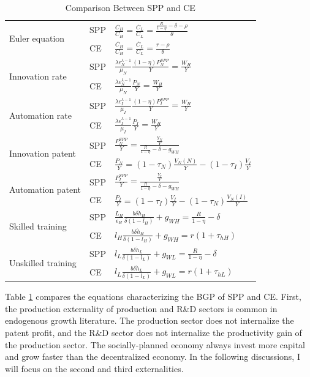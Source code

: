 \documentclass[12pt]{article}
\begin{document}
\begin{table}[h!]
\center
\scriptsize
\renewcommand{\arraystretch}{2}
\begin{tabular}{l|ll}
\hline \hline
\multirow{2}{*}{Euler equation} & SPP  &  
$\frac{\dot{C_H}}{C_H} = \frac{\dot{C_L}}{C_L} = \frac{\frac{R}{1-\eta}-\delta-\rho}{\theta}$ \\
& CE &$\frac{\dot{C_H}}{C_H} = \frac{\dot{C_L}}{C_L} = \frac{r-\rho}{\theta}$ \\\hline
\multirow{2}{*}{Innovation rate} & SPP  &  
$\frac{\lambda\epsilon_N^{\lambda-1}}{\mu_N}\frac{(1-\eta)P_N^{SPP}}{Y} = \frac{W_H}{Y} $  \\ 
& CE &$\frac{\lambda\epsilon_N^{\lambda-1}}{\mu_N}\frac{P_N}{Y}  = \frac{W_H}{Y}$ \\\hline
\multirow{2}{*}{Automation rate}  & SPP  &  
$ \frac{\lambda\epsilon_I^{\lambda-1}}{\mu_I}\frac{(1-\eta)P_I^{SPP}}{Y}  = \frac{W_H}{Y}$  \\
& CE &$ \frac{\lambda\epsilon_I^{\lambda-1}}{\mu_I}\frac{P_I}{Y}  = \frac{W_H}{Y}$ \\\hline
\multirow{2}{*}{Innovation patent} & SPP  &  
$\frac{P_N^{SPP}}{Y} = \frac{\frac{Y_N}{Y}}{\frac{R}{1-\eta}-\delta-g_{WH}}$  \\
& CE &$\frac{P_N}{Y} =(1-\tau_N)\frac{V_N(N)}{Y}-(1-\tau_I)\frac{V_I}{Y}$ \\\hline
\multirow{2}{*}{Automation patent} & SPP  &  
$\frac{P_I^{SPP}}{Y}= \frac{\frac{Y_I}{Y}}{\frac{R}{1-\eta}-\delta-g_{WH}}$  \\
& CE &$\frac{P_I}{Y}  =  (1-\tau_I)\frac{V_I}{Y}-(1-\tau_N)\frac{V_N(I)}{Y}$ \\\hline
\multirow{2}{*}{Skilled training} & SPP  &  
$\frac{L_H}{\epsilon_H}\frac{b\delta \dot{h}_H}{\delta(1-l_H)}+g_{WH} = \frac{R}{1-\eta}-\delta$  \\ 
& CE &$l_H\frac{b\delta \dot{h}_H}{\delta(1-l_H)}+g_{WH} =  r(1+\tau_{hH})$ \\\hline
\multirow{2}{*}{Unskilled training} & SPP  &  
$l_L\frac{b\delta \dot{h}_L}{\delta(1-l_L)}+g_{WL}= \frac{R}{1-\eta}-\delta$  \\ 
& CE &$l_L\frac{b\delta \dot{h}_L}{\delta(1-l_L)}+g_{WL}=  r(1+\tau_{hL})$ \\\hline
\end{tabular}
\renewcommand{\arraystretch}{1}
\caption{Comparison Between SPP and CE}
\label{SPP_CE}
\end{table}

Table \ref{SPP_CE} compares the equations characterizing the BGP of SPP and CE. First, the production externality of production and R\&D sectors is common in endogenous growth literature. The production sector does not internalize the patent profit, and the R\&D sector does not internalize the productivity gain of the production sector. The socially-planned economy always invest more capital and grow faster than the decentralized economy. In the following discussions, I will focus on the second and third externalities.
\end{document}
